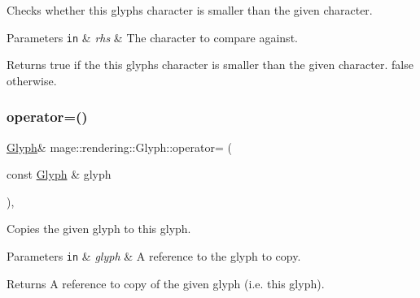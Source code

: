 Checks whether this glyph\textquotesingle{}s character is smaller than the given character.


\begin{DoxyParams}[1]{Parameters}
\mbox{\tt in}  & {\em rhs} & The character to compare against. \\
\hline
\end{DoxyParams}
\begin{DoxyReturn}{Returns}
{\ttfamily true} if the this glyph\textquotesingle{}s character is smaller than the given character. {\ttfamily false} otherwise. 
\end{DoxyReturn}
\mbox{\label{structmage_1_1rendering_1_1_glyph_ae399a7c5ff5eeb842c56febd18cc16d2}} 
\subsubsection{\texorpdfstring{operator=()}{operator=()}\hspace{0.1cm}{\footnotesize\ttfamily [1/2]}}
{\footnotesize\ttfamily \mbox{\hyperlink{structmage_1_1rendering_1_1_glyph}{Glyph}}\& mage\+::rendering\+::\+Glyph\+::operator= (\begin{DoxyParamCaption}\item[{const \mbox{\hyperlink{structmage_1_1rendering_1_1_glyph}{Glyph}} \&}]{glyph }\end{DoxyParamCaption})\hspace{0.3cm}{\ttfamily [default]}, {\ttfamily [noexcept]}}

Copies the given glyph to this glyph.


\begin{DoxyParams}[1]{Parameters}
\mbox{\tt in}  & {\em glyph} & A reference to the glyph to copy. \\
\hline
\end{DoxyParams}
\begin{DoxyReturn}{Returns}
A reference to copy of the given glyph (i.\+e. this glyph). 
\end{DoxyReturn}
\mbox{\label{structmage_1_1rendering_1_1_glyph_a1cac277e308a594b75308af6207a5e0a}} 
